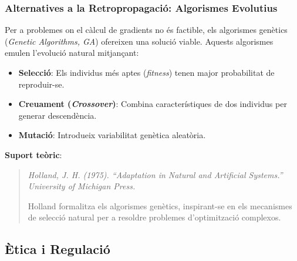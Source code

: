 \subsubsection{Alternatives a la Retropropagació: Algorismes Evolutius}
Per a problemes on el càlcul de gradients no és factible, els algorismes genètics (\textit{Genetic Algorithms, GA}) ofereixen una solució viable. Aquests algorismes emulen l'evolució natural mitjançant:

\begin{itemize}
\item \textbf{Selecció}: Els individus més aptes (\textit{fitness}) tenen major probabilitat de reproduir-se.

\item \textbf{Creuament (\textit{Crossover})}: Combina característiques de dos individus per generar descendència.

\item \textbf{Mutació}: Introdueix variabilitat genètica aleatòria.
\end{itemize}

\textbf{Suport teòric}:
\begin{quote}
\textit{Holland, J. H. (1975). ``Adaptation in Natural and Artificial Systems.'' University of Michigan Press.}

Holland formalitza els algorismes genètics, inspirant-se en els mecanismes de selecció natural per a resoldre problemes d'optimització complexos.
\end{quote}

\subsection{Ètica i Regulació}\label{subsec:Ètica i Regulació}

